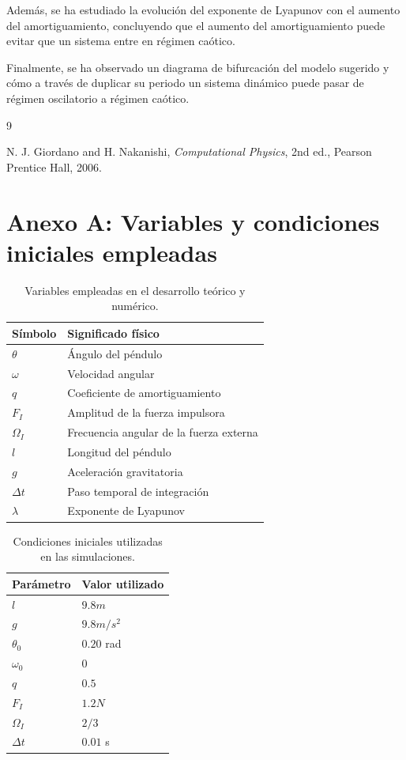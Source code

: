 \documentclass[11pt,a4paper]{article}
\begin{document}
Además, se ha estudiado la evolución del exponente de Lyapunov con el aumento del amortiguamiento, concluyendo que el aumento del amortiguamiento puede evitar que un sistema entre en régimen caótico.

Finalmente, se ha observado un diagrama de bifurcación del modelo sugerido y cómo a través de duplicar su periodo un sistema dinámico puede pasar de régimen oscilatorio a régimen caótico.


\begin{thebibliography}{9}

N. J. Giordano and H. Nakanishi,
\textit{Computational Physics},
2nd ed., Pearson Prentice Hall, 2006.
\label{giordano}
\end{thebibliography}

\newpage
\appendix
\section*{Anexo A: Variables y condiciones iniciales empleadas}


\begin{table}[H]
\centering
\begin{tabular}{ll}
\toprule
Símbolo & Significado físico \\
\midrule
$\theta$ & Ángulo del péndulo \\
$\omega$ & Velocidad angular \\
$q$ & Coeficiente de amortiguamiento \\
$F_I$ & Amplitud de la fuerza impulsora \\
$\Omega_I$ & Frecuencia angular de la fuerza externa \\
$l$ & Longitud del péndulo \\
$g$ & Aceleración gravitatoria \\
$\Delta t$ & Paso temporal de integración \\
$\lambda$ & Exponente de Lyapunov \\
\bottomrule
\end{tabular}
\caption{Variables empleadas en el desarrollo teórico y numérico.}
\end{table}

\begin{table}[H]
\centering
\begin{tabular}{ll}
\toprule
Parámetro & Valor utilizado \\
\midrule
$l$ & $9.8m$ \\
$g$ & $9.8 m/s^2$ \\
$\theta_0$ & $0.20$ rad \\
$\omega_0$ & $0$ \\
$q$ & $0.5$ \\
$F_I$ & $1.2N$ \\
$\Omega_I$ & $2/3$ \\
$\Delta t$ & $0.01$ s \\
\bottomrule
\end{tabular}
\caption{Condiciones iniciales utilizadas en las simulaciones.}
\label{tab:ci}
\end{table}
\end{document}

